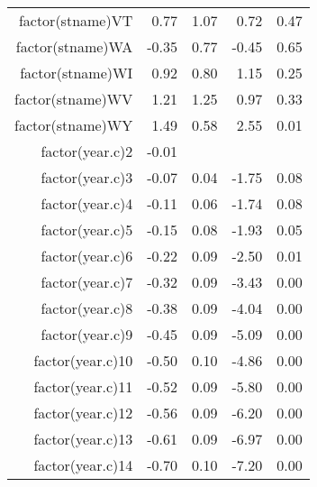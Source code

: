 \begin{table}[ht]
\begin{tabular}{rrrrr}
  factor(stname)VT & 0.77 & 1.07 & 0.72 & 0.47 \\ 
  factor(stname)WA & -0.35 & 0.77 & -0.45 & 0.65 \\ 
  factor(stname)WI & 0.92 & 0.80 & 1.15 & 0.25 \\ 
  factor(stname)WV & 1.21 & 1.25 & 0.97 & 0.33 \\ 
  factor(stname)WY & 1.49 & 0.58 & 2.55 & 0.01 \\ 
  factor(year.c)2 & -0.01 &  &  &  \\ 
  factor(year.c)3 & -0.07 & 0.04 & -1.75 & 0.08 \\ 
  factor(year.c)4 & -0.11 & 0.06 & -1.74 & 0.08 \\ 
  factor(year.c)5 & -0.15 & 0.08 & -1.93 & 0.05 \\ 
  factor(year.c)6 & -0.22 & 0.09 & -2.50 & 0.01 \\ 
  factor(year.c)7 & -0.32 & 0.09 & -3.43 & 0.00 \\ 
  factor(year.c)8 & -0.38 & 0.09 & -4.04 & 0.00 \\ 
  factor(year.c)9 & -0.45 & 0.09 & -5.09 & 0.00 \\ 
  factor(year.c)10 & -0.50 & 0.10 & -4.86 & 0.00 \\ 
  factor(year.c)11 & -0.52 & 0.09 & -5.80 & 0.00 \\ 
  factor(year.c)12 & -0.56 & 0.09 & -6.20 & 0.00 \\ 
  factor(year.c)13 & -0.61 & 0.09 & -6.97 & 0.00 \\ 
  factor(year.c)14 & -0.70 & 0.10 & -7.20 & 0.00 \\ 
   \hline
\end{tabular}
\end{table}
